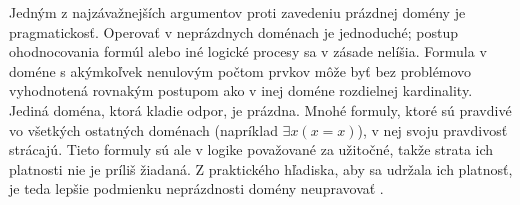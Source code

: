 \documentclass[12pt, letterpaper]{article}
\begin{document}

Jedným z najzávažnejších argumentov proti zavedeniu prázdnej domény je pragmatickosť. Operovať v neprázdnych doménach je jednoduché; postup ohodnocovania formúl alebo iné logické procesy sa v zásade nelíšia. Formula v doméne s akýmkoľvek nenulovým počtom prvkov môže byť bez problémovo vyhodnotená rovnakým postupom ako v inej doméne rozdielnej kardinality. Jediná doména, ktorá kladie odpor, je prázdna. Mnohé formuly, ktoré sú pravdivé vo všetkých ostatných doménach (napríklad $\exists x (x = x)$), v nej svoju pravdivosť strácajú. Tieto formuly sú ale v logike považované za užitočné, takže strata ich platnosti nie je príliš žiadaná. Z praktického hľadiska, aby sa udržala ich platnosť, je teda lepšie podmienku neprázdnosti domény neupravovať \parencites[177]{quine_quantification_1954}.\par
\end{document}
